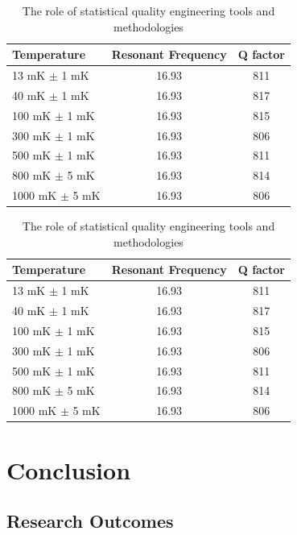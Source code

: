 \documentclass[oneside]{utmthesis}
\begin{document}
\begin{table}[!ht]
\centering
\caption{The role of statistical quality engineering tools and methodologies}
\vspace{\baselineskip}
\begin{tabular}{l c c}
  \hline
  \hline
  Temperature & Resonant Frequency & Q factor\\
  \hline
  13 mK $\pm$ 1 mK & 16.93 & 811 \\
  40 mK $\pm$ 1 mK & 16.93 & 817 \\
  100 mK $\pm$ 1 mK & 16.93 & 815 \\
  300 mK $\pm$ 1 mK & 16.93 & 806\\
  500 mK $\pm$ 1 mK & 16.93 & 811\\
  800 mK $\pm$ 5 mK & 16.93 & 814\\
  1000 mK $\pm$ 5 mK & 16.93 & 806 \\
  \hline
  \hline
\end{tabular}
\end{table}

\begin{landscape}
\begin{table}[p]
\centering
\caption{The role of statistical quality engineering tools and methodologies}
\vspace{\baselineskip}
\begin{tabular}{l c c}
  \hline
  \hline
  Temperature & Resonant Frequency & Q factor\\
  \hline
  13 mK $\pm$ 1 mK & 16.93 & 811 \\
  40 mK $\pm$ 1 mK & 16.93 & 817 \\
  100 mK $\pm$ 1 mK & 16.93 & 815 \\
  300 mK $\pm$ 1 mK & 16.93 & 806\\
  500 mK $\pm$ 1 mK & 16.93 & 811\\
  800 mK $\pm$ 5 mK & 16.93 & 814\\
  1000 mK $\pm$ 5 mK & 16.93 & 806 \\
  \hline
  \hline
\end{tabular}
\end{table}
\end{landscape}


\chapter{Conclusion}
\section{Research Outcomes}
\end{document}
